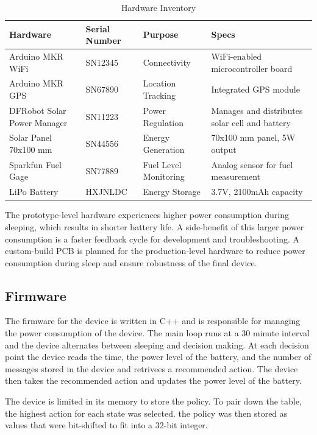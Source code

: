 \documentclass[10pt]{cai}
\begin{document}
\begin{table}[h!]
  \centering
  \caption{Hardware Inventory}
  \begin{tabular}{|l|l|l|l|}
  \hline
  \textbf{Hardware} & \textbf{Serial Number} & \textbf{Purpose} & \textbf{Specs} \\ \hline
  Arduino MKR WiFi & SN12345 & Connectivity & WiFi-enabled microcontroller board \\ \hline
  Arduino MKR GPS  & SN67890 & Location Tracking & Integrated GPS module \\ \hline
  DFRobot Solar Power Manager & SN11223 & Power Regulation & Manages and distributes solar cell and battery \\ \hline
  Solar Panel 70x100 mm & SN44556 & Energy Generation & 70x100 mm panel, 5W output \\ \hline
  Sparkfun Fuel Gage & SN77889 & Fuel Level Monitoring & Analog sensor for fuel measurement \\ \hline
  LiPo Battery & HXJNLDC & Energy Storage & 3.7V, 2100mAh capacity \\ \hline
  \end{tabular}
  \label{tab:hardware_inventory}
  \end{table}

The prototype-level hardware experiences higher power consumption during sleeping, which results in shorter battery life. 
A side-benefit of this larger power consumption is a faster feedback cycle for development and troubleshooting. 
A custom-build PCB is planned for the production-level hardware to reduce power consumption during sleep and ensure robustness of the final device.

\subsection{Firmware}
The firmware for the device is written in C++ and is responsible for managing the power consumption of the device.
The main loop runs at a 30 minute interval and the device alternates between sleeping and decision making.
At each decision point the device reads the time, the power level of the battery, and the number of messages stored in the device and retrivees a recommended action.
The device then takes the recommended action and updates the power level of the battery.

The device is limited in its memory to store the policy.
To pair down the table, the highest action for each state was selected.
the policy was then stored as values that were bit-shifted to fit into a 32-bit integer.
\end{document}
